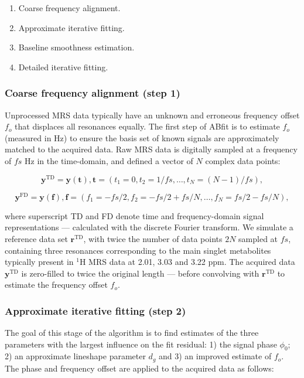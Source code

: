 \documentclass[num-refs]{wiley-article}
\begin{document}
\begin{enumerate}
  \item Coarse frequency alignment.
  \item Approximate iterative fitting.
  \item Baseline smoothness estimation.
  \item Detailed iterative fitting.
\end{enumerate}

\subsubsection{Coarse frequency alignment (step 1)}
Unprocessed MRS data typically have an unknown and erroneous frequency offset $f_{o}$ that displaces all resonances equally. The first step of ABfit is to estimate $f_{o}$ (measured in Hz) to ensure the basis set of known signals are approximately matched to the acquired data. Raw MRS data is digitally sampled at a frequency of $\mathit{fs}$ Hz in the time-domain, and defined a vector of $N$ complex data points:

\begin{equation}
  \mathbf{y}^{\mathrm{TD}} = \mathbf{y}(\mathbf{t}), \mathbf{t}=(t_{1}=0,t_{2} =1/\mathit{fs},\ldots,t_{N}=(N-1)/\mathit{fs}),
\end{equation}

\begin{equation}
  \mathbf{y}^{\mathrm{FD}} = \mathbf{y}(\mathbf{f}), \mathbf{f}=(f_{1}=-\mathit{fs}/2,f_{2} =-\mathit{fs}/2 + \mathit{fs}/N ,\ldots,f_{N}=\mathit{fs}/2 - \mathit{fs}/N),
\end{equation}

where superscript TD and FD denote time and frequency-domain signal representations --- calculated with the discrete Fourier transform. We simulate a reference data set $\mathbf{r}^{\mathrm{TD}}$, with twice the number of data points $2N$ sampled at $\mathit{fs}$, containing three resonances corresponding to the main singlet metabolites typically present in $^1\mathrm{H}$ MRS data at 2.01, 3.03 and 3.22 ppm. The acquired data $\mathbf{y}^{\mathrm{TD}}$ is zero-filled to twice the original length --- before convolving with  $\mathbf{r}^{\mathrm{TD}}$ to estimate the frequency offset $f_{o}$.


\subsubsection{Approximate iterative fitting (step 2)}
The goal of this stage of the algorithm is to find estimates of the three parameters with the largest influence on the fit residual: 1) the signal phase $\phi_{0}$; 2) an approximate lineshape parameter $d_{g}$ and 3) an improved estimate of $f_{o}$. The phase and frequency offset are applied to the acquired data as follows:
\end{document}
